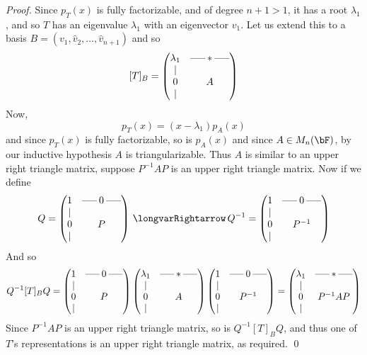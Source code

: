 \begin{proof}
    Since $p_T(x)$ is fully factorizable, and of degree $n+1>1$, it has a root $\lambda_1$, and so $T$ has an eigenvalue $\lambda_1$ with an eigenvector $v_1$.
    Let us extend this to a basis $B=(v_1,\hat v_2,\dots,\hat v_{n+1})$ and so
    \[ [T]_B = \pmat{\lambda_1 & \hort*\hort \\ \begin{matrix} \vert \\ 0 \\ \vert \end{matrix} & A} \]
    Now,
    \[ p_T(x) = (x-\lambda_1)p_A(x) \]
    and since $p_T(x)$ is fully factorizable, so is $p_A(x)$ and since $A\in M_n(\bF)$, by our inductive hypothesis $A$ is triangularizable.
    Thus $A$ is similar to an upper right triangle matrix, suppose $P^{-1}AP$ is an upper right triangle matrix.
    Now if we define
    \[ Q = \pmat{1 & \hort\:0\:\hort \\ \begin{matrix} \vert \\ 0 \\ \vert \end{matrix} & P} \implies Q^{-1} = \pmat{1 & \hort\:0\:\hort \\ \begin{matrix} \vert\\0\\\vert \end{matrix} & P^{-1}} \]
    And so
    \[ Q^{-1}[T]_BQ = \pmat{1 & \hort\:0\:\hort \\ \begin{matrix} \vert \\ 0 \\ \vert \end{matrix} & P}\pmat{\lambda_1 & \hort * \hort \\ \begin{matrix} \vert \\ 0 \\ \vert \end{matrix} & A}
    \pmat{1 & \hort\:0\:\hort \\ \begin{matrix} \vert\\0\\\vert \end{matrix} & P^{-1}} = \pmat{\lambda_1 & \hort * \hort \\ \begin{matrix} \vert \\ 0 \\ \vert \end{matrix} & P^{-1}AP} \]
    Since $P^{-1}AP$ is an upper right triangle matrix, so is $Q^{-1}[T]_BQ$, and thus one of $T$'s representations is an upper right triangle matrix, as required.
    \qed

\end{proof}


